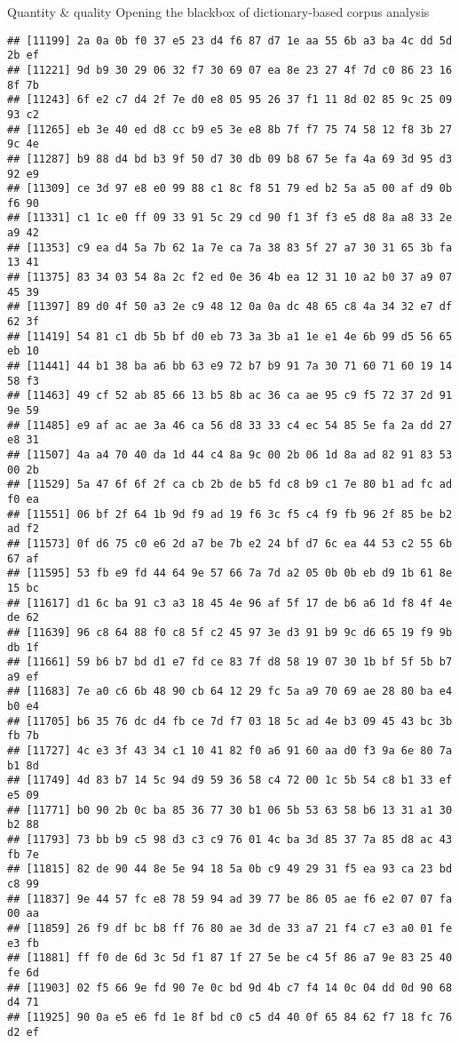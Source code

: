 \documentclass[
  ignorenonframetext,
]{beamer}
\begin{document}
\begin{frame}[fragile]{Quantity \& quality \textbar{} Opening the
blackbox of dictionary-based corpus analysis}
\begin{verbatim}
## [11199] 2a 0a 0b f0 37 e5 23 d4 f6 87 d7 1e aa 55 6b a3 ba 4c dd 5d 2b ef
## [11221] 9d b9 30 29 06 32 f7 30 69 07 ea 8e 23 27 4f 7d c0 86 23 16 8f 7b
## [11243] 6f e2 c7 d4 2f 7e d0 e8 05 95 26 37 f1 11 8d 02 85 9c 25 09 93 c2
## [11265] eb 3e 40 ed d8 cc b9 e5 3e e8 8b 7f f7 75 74 58 12 f8 3b 27 9c 4e
## [11287] b9 88 d4 bd b3 9f 50 d7 30 db 09 b8 67 5e fa 4a 69 3d 95 d3 92 e9
## [11309] ce 3d 97 e8 e0 99 88 c1 8c f8 51 79 ed b2 5a a5 00 af d9 0b f6 90
## [11331] c1 1c e0 ff 09 33 91 5c 29 cd 90 f1 3f f3 e5 d8 8a a8 33 2e a9 42
## [11353] c9 ea d4 5a 7b 62 1a 7e ca 7a 38 83 5f 27 a7 30 31 65 3b fa 13 41
## [11375] 83 34 03 54 8a 2c f2 ed 0e 36 4b ea 12 31 10 a2 b0 37 a9 07 45 39
## [11397] 89 d0 4f 50 a3 2e c9 48 12 0a 0a dc 48 65 c8 4a 34 32 e7 df 62 3f
## [11419] 54 81 c1 db 5b bf d0 eb 73 3a 3b a1 1e e1 4e 6b 99 d5 56 65 eb 10
## [11441] 44 b1 38 ba a6 bb 63 e9 72 b7 b9 91 7a 30 71 60 71 60 19 14 58 f3
## [11463] 49 cf 52 ab 85 66 13 b5 8b ac 36 ca ae 95 c9 f5 72 37 2d 91 9e 59
## [11485] e9 af ac ae 3a 46 ca 56 d8 33 33 c4 ec 54 85 5e fa 2a dd 27 e8 31
## [11507] 4a a4 70 40 da 1d 44 c4 8a 9c 00 2b 06 1d 8a ad 82 91 83 53 00 2b
## [11529] 5a 47 6f 6f 2f ca cb 2b de b5 fd c8 b9 c1 7e 80 b1 ad fc ad f0 ea
## [11551] 06 bf 2f 64 1b 9d f9 ad 19 f6 3c f5 c4 f9 fb 96 2f 85 be b2 ad f2
## [11573] 0f d6 75 c0 e6 2d a7 be 7b e2 24 bf d7 6c ea 44 53 c2 55 6b 67 af
## [11595] 53 fb e9 fd 44 64 9e 57 66 7a 7d a2 05 0b 0b eb d9 1b 61 8e 15 bc
## [11617] d1 6c ba 91 c3 a3 18 45 4e 96 af 5f 17 de b6 a6 1d f8 4f 4e de 62
## [11639] 96 c8 64 88 f0 c8 5f c2 45 97 3e d3 91 b9 9c d6 65 19 f9 9b db 1f
## [11661] 59 b6 b7 bd d1 e7 fd ce 83 7f d8 58 19 07 30 1b bf 5f 5b b7 a9 ef
## [11683] 7e a0 c6 6b 48 90 cb 64 12 29 fc 5a a9 70 69 ae 28 80 ba e4 b0 e4
## [11705] b6 35 76 dc d4 fb ce 7d f7 03 18 5c ad 4e b3 09 45 43 bc 3b fb 7b
## [11727] 4c e3 3f 43 34 c1 10 41 82 f0 a6 91 60 aa d0 f3 9a 6e 80 7a b1 8d
## [11749] 4d 83 b7 14 5c 94 d9 59 36 58 c4 72 00 1c 5b 54 c8 b1 33 ef e5 09
## [11771] b0 90 2b 0c ba 85 36 77 30 b1 06 5b 53 63 58 b6 13 31 a1 30 b2 88
## [11793] 73 bb b9 c5 98 d3 c3 c9 76 01 4c ba 3d 85 37 7a 85 d8 ac 43 fb 7e
## [11815] 82 de 90 44 8e 5e 94 18 5a 0b c9 49 29 31 f5 ea 93 ca 23 bd c8 99
## [11837] 9e 44 57 fc e8 78 59 94 ad 39 77 be 86 05 ae f6 e2 07 07 fa 00 aa
## [11859] 26 f9 df bc b8 ff 76 80 ae 3d de 33 a7 21 f4 c7 e3 a0 01 fe e3 fb
## [11881] ff f0 de 6d 3c 5d f1 87 1f 27 5e be c4 5f 86 a7 9e 83 25 40 fe 6d
## [11903] 02 f5 66 9e fd 90 7e 0c bd 9d 4b c7 f4 14 0c 04 dd 0d 90 68 d4 71
## [11925] 90 0a e5 e6 fd 1e 8f bd c0 c5 d4 40 0f 65 84 62 f7 18 fc 76 d2 ef

\end{verbatim}
\end{frame}
\end{document}
